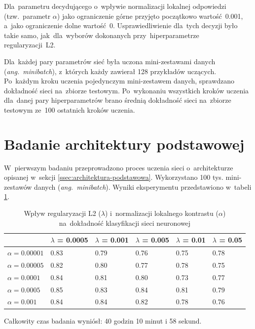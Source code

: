 Dla~parametru decydującego o~wpływie normalizacji lokalnej odpowiedzi (tzw.~parametr $\alpha$) jako ograniczenie górne
przyjęto początkowo wartość~0.001, a~jako ograniczenie dolne wartość~0. Usprawiedliwienie dla~tych decyzji było
takie samo, jak~dla~wyborów dokonanych przy~hiperparametrze regularyzacji~L2.

Dla~każdej pary parametrów sieć była uczona mini-zestawami danych (\textit{ang.~minibatch}), z~których
każdy zawierał 128 przykładów uczących. Po~każdym kroku uczenia pojedynczym mini-zestawem danych, sprawdzano
dokładność sieci na~zbiorze testowym. Po~wykonaniu wszystkich kroków uczenia dla~danej pary hiperparametrów
brano średnią dokładność sieci na~zbiorze testowym ze~100 ostatnich kroków uczenia.

\section{Badanie architektury podstawowej} \label{sec:badanie-1}
W~pierwszym badaniu przeprowadzono proces uczenia sieci o~architekturze opisanej w~sekcji
\ref{ssec:architektura-podstawowa}. Wykorzystano 100 tys. mini-zestawów danych (\textit{ang.~minibatch}).
Wyniki eksperymentu przedstawiono w~tabeli \ref{table:wyniki1}.

\begin{table}[H]
    \centering
    \begin{tabular}{|l|l|l|l|l|l|}
      \hline
                       & $\lambda$ = 0.0005 & $\lambda$ = 0.001 & $\lambda$ = 0.005 & $\lambda$ = 0.01 & $\lambda$ = 0.05 \\
      \hline
      $\alpha=0.00001$ & 0.83 & 0.79 & 0.76 & 0.75 & 0.78 \\
      \hline
      $\alpha=0.00005$ & 0.82 & 0.80 & 0.77 & 0.78 & 0.75 \\
      \hline
      $\alpha=0.0001$  & 0.84 & 0.81 & 0.80 & 0.73 & 0.77 \\
      \hline
      $\alpha=0.0005$  & 0.85 & 0.83 & 0.84 & 0.81 & 0.79 \\
      \hline
      $\alpha=0.001$   & 0.84 & 0.84 & 0.82 & 0.78 & 0.76 \\
      \hline
    \end{tabular}
    \caption{Wpływ regularyzacji L2 ($\lambda$) i~normalizacji lokalnego kontrastu ($\alpha$) na~dokładność klasyfikacji
    sieci neuronowej}
    \label{table:wyniki1}
\end{table}

Całkowity czas badania wyniósł: 40 godzin 10 minut i 58 sekund.

